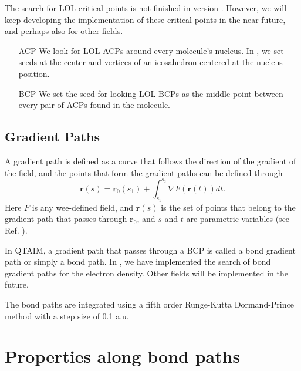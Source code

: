 The search for LOL critical points is not finished in version \dtkversion. However, we will keep developing the implementation of these critical points in the near future, and perhaps also for other fields.

\begin{itemize}
\item[ACP] We look for LOL ACPs around every molecule's nucleus. In \DTK{} \dtkversion,
  we set seeds at the center and vertices of an icosahedron centered at the nucleus position.
\item[BCP] We set the seed for looking LOL BCPs as the middle point between every pair of ACPs found in the molecule.
\end{itemize}

\subsection{Gradient Paths}

A gradient path is defined as a curve that follows the direction of the gradient of the field, and the points that form the gradient paths can be defined through
%
\begin{equation}
   \boldsymbol{r}(s)=\boldsymbol{r}_0(s_1)+\int_{s_1}^{s_2}\nabla F(\boldsymbol{r}(t))dt.
\end{equation}
%
Here $F$ is any wee-defined field, and $\boldsymbol{r}(s)$ is the set of points that belong to the gradient path that passes through $\boldsymbol{r}_0$, and $s$ and $t$ are parametric variables (see Ref. \cite{bib:bader1990book}).

In QTAIM, a gradient path that passes through a BCP is called a bond gradient path or simply a bond path. In \DTK{} \dtkversion, we have implemented the search of bond gradient paths for the electron density. Other fields will be implemented in the future.

The bond paths are integrated using a fifth order Runge-Kutta Dormand-Prince method with a
step size of 0.1 a.u.


\section{Properties along bond paths}


